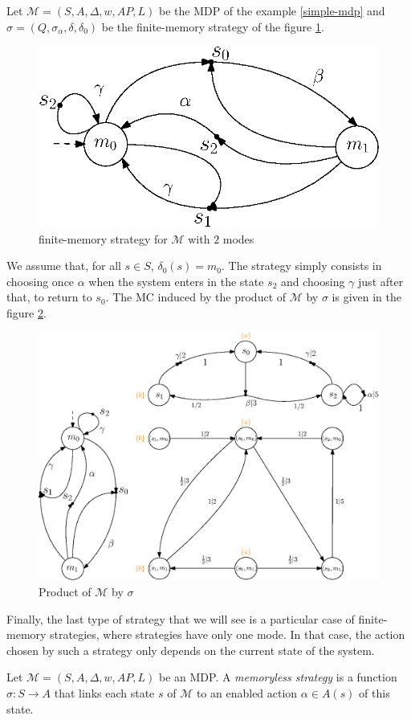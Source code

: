 \begin{example}
  Let $\mathcal{M}=(S, A, \Delta, w, AP, L)$ be the MDP of the example \ref{simple-mdp} and $\sigma = (Q, \sigma_\alpha, \delta, \delta_0)$ be the
  finite-memory strategy of the figure \ref{finite_mem_strat}.
  \begin{figure}[h!]
    \centering
    \includegraphics[width=0.4\linewidth]{resources/strategy}
    \caption{finite-memory strategy for $\mathcal{M}$ with $2$ modes}\label{finite_mem_strat}
  \end{figure}

  We assume that, for all $s \in S$, $\delta_0(s) = m_0$. The strategy simply consists in choosing once $\alpha$ when the system enters in the state $s_2$ and choosing $\gamma$ just after that, to return to $s_0$. The MC induced by the product of $\mathcal{M}$ by $\sigma$ is given in the figure
  \ref{inducedMC}.
  \begin{figure}[H]
    \centering
    \includegraphics[width=0.55\linewidth]{resources/inductedmarkov}
    \caption{Product of $\mathcal{M}$ by $\sigma$}\label{inducedMC}
  \end{figure}
\end{example}

Finally, the last type of strategy that we will see is a particular case of finite-memory strategies, where strategies have only one mode.
In that case, the action chosen by such a strategy only depends on the current state of the system.

\begin{definition}
  Let $\mathcal{M}=(S, A, \Delta, w, AP, L)$ be an MDP. A \textit{memoryless strategy} is a function
  $
    \sigma: S \rightarrow A
  $ that links each state $s$ of $\mathcal{M}$ to an enabled action $\alpha \in A(s)$ of this state.
\end{definition}

